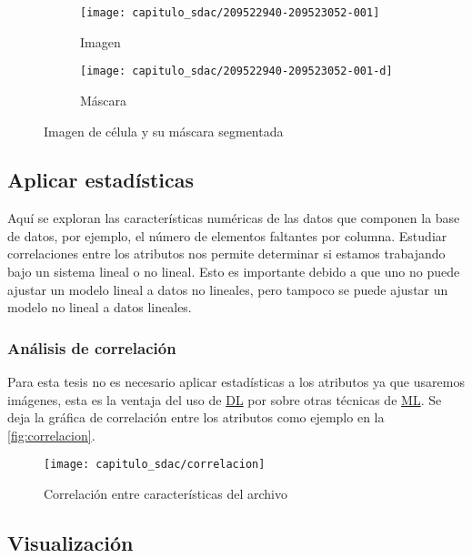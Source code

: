 \begin{figure}[H]
    \centering
    \begin{subfigure}{.5\textwidth}
        \centering
        \texttt{[image: capitulo\_sdac/209522940-209523052-001]}
        \caption{Imagen}
    \end{subfigure}%
    \begin{subfigure}{.5\textwidth}
        \centering
        \texttt{[image: capitulo\_sdac/209522940-209523052-001-d]}
        \caption{Máscara}
    \end{subfigure}
    \caption{Imagen de célula y su máscara segmentada}
    \label{fig:imagen_mascara}
    \end{figure}

\subsection{Aplicar estadísticas}

Aquí se exploran las características numéricas de las datos que componen la base
de datos, por ejemplo, el número de elementos faltantes por columna. Estudiar
correlaciones entre los atributos nos permite determinar si estamos trabajando
bajo un sistema lineal o no lineal. Esto es importante debido a que uno no puede
ajustar un modelo lineal a datos no lineales, pero tampoco se puede ajustar un
modelo no lineal a datos lineales. 

\subsubsection{Análisis de correlación}

Para esta tesis no es necesario aplicar estadísticas a los atributos ya que
usaremos imágenes, esta es la ventaja del uso de \hyperlink{abbr}{DL} por sobre
otras técnicas de \hyperlink{abbr}{ML}. Se deja la gráfica de correlación entre
los atributos como ejemplo en la \autoref{fig:correlacion}.

\begin{figure}[H]
\centering
\texttt{[image: capitulo\_sdac/correlacion]}
\caption{Correlación entre características del archivo}\label{fig:correlacion}
\end{figure}

\subsection{Visualización}

